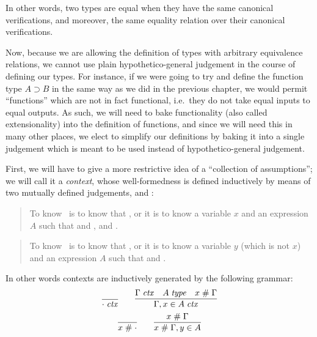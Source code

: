\documentclass[main.tex]{subfiles}
\begin{document}
In other words, two types are equal when they have the same canonical
verifications, and moreover, the same equality relation over their canonical
verifications.

Now, because we are allowing the definition of types with arbitrary equivalence
relations, we cannot use plain hypothetico-general judgement in the course of
defining our types. For instance, if we were going to try and define the
function type $A\supset B$ in the same way as we did in the previous chapter,
we would permit ``functions'' which are not in fact functional, i.e.\ they do
not take equal inputs to equal outputs. As such, we will need to bake
functionality (also called extensionality) into the definition of functions,
and since we will need this in many other places, we elect to simplify our
definitions by baking it into a single judgement which is meant to be used
instead of hypothetico-general judgement.

First, we will have to give a more restrictive idea of a ``collection of
assumptions''; we will call it a \emph{context}, whose well-formedness is
defined inductively by means of two mutually defined judgements,
\framebox{\isctx{\Gamma}} and :

\begin{quote}
  To know \isctx\Gamma\ is to know that \reduce{\Gamma}{\cdot}, or it is to know
  a variable $x$ and an expression $A$ such that 
  and , and .
\end{quote}

\begin{quote}
  To know \ is to know that \reduce{\Gamma}{\cdot}, or it is to know
  a variable $y$ (which is not $x$) and an expression $A$ such that 
  and .
\end{quote}

In other words contexts are inductively generated by the following grammar:
\begin{gather*}
  \infer{\isctx\cdot}{}
  \qquad
  \infer{
    \isctx{\Gamma,\ver{x}{A}}
  }{
    \isctx\Gamma &
    \isset{A} &
    \fresh{x}{\Gamma}
  }\\
  \infer{\fresh{x}{\cdot}}{}
  \qquad
  \infer{
    \fresh{x}{\Gamma,\ver{y}{A}}
  }{
    \fresh{x}{\Gamma}
  }
\end{gather*}
\end{document}
